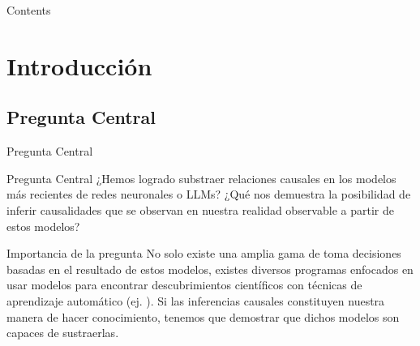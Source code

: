 \documentclass[aspectratio=169,xcolor=dvipsnames]{beamer}
\begin{document}
\begin{frame}[plain]
  \titlepage
\end{frame}

\begin{frame}[plain]{Contents}
  \tableofcontents
\end{frame}

\section{Introducción}
\subsection{Pregunta Central}
  \begin{frame}{Pregunta Central}
    \begin{block}{Pregunta Central}
      ¿Hemos logrado substraer relaciones causales en los modelos más recientes de redes neuronales o LLMs?
      ¿Qué nos demuestra la posibilidad de inferir causalidades que se observan en nuestra realidad observable a partir de estos modelos?
    \end{block}
    
    \begin{exampleblock}{Importancia de la pregunta}
      No solo existe una amplia gama de toma decisiones basadas en el resultado de estos modelos, existes diversos programas enfocados en usar modelos para encontrar descubrimientos científicos con técnicas de aprendizaje automático (ej. \cite{hey2009fourth, wang2023scientific,ioannidis20245th, bianchini2020deep}). 
      Si las inferencias causales constituyen nuestra manera de hacer conocimiento, tenemos que demostrar que dichos modelos son capaces de sustraerlas. 
    \end{exampleblock}
  \end{frame}
\end{document}
